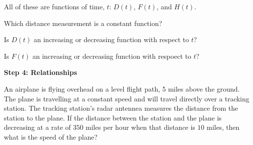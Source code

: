 \documentclass{ximera}
\begin{document}
All of these are functions of time, $t$: $D(t)$, $F(t)$, and $H(t)$.


\begin{question} 


Which distance measurement is a constant function?

\begin{multipleChoice}
\end{multipleChoice}

\end{question}



\begin{question} 


Is $D(t)$ an increasing or decreasing function with respect to $t$?

\begin{multipleChoice}
\end{multipleChoice}

\end{question}



\begin{question} 


Is $F(t)$ an increasing or decreasing function with respoect to $t$?

\begin{multipleChoice}
\end{multipleChoice}

\end{question}










\textbf{\textcolor{purple!85!blue}{Step 4: Relationships}}


An airplane is flying overhead on a level flight path, 5 miles above the ground.  The plane is travelling at a constant speed and will travel directly over a tracking station. The tracking station's radar antennea measures the distance from the station to the plane. If the distance between the station and the plane is decreasing at a rate of $350$ miles per hour when that distance is $10$ miles, then what is the speed of the plane?
\end{document}
